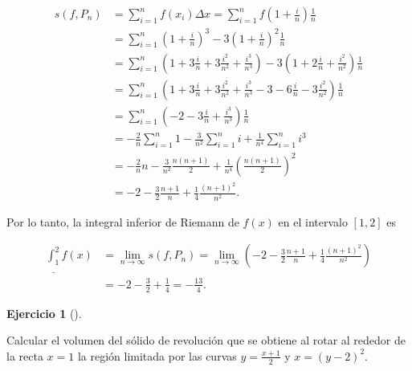 \documentclass[
  a4paper,
]{scrreport}
\theoremstyle{definition}
\newtheorem{exercise}{Ejercicio}[chapter]
\theoremstyle{remark}
\begin{document}
\begin{tcolorbox}
\begin{align*}
s(f,P_n) 
&= \sum_{i=1}^{n} f(x_i) \Delta x = \sum_{i=1}^{n} f\left(1 + \frac{i}{n}\right) \frac{1}{n} \\
&= \sum_{i=1}^{n} \left(1 + \frac{i}{n}\right)^3 - 3\left(1 + \frac{i}{n}\right)^2 \frac{1}{n} \\
&= \sum_{i=1}^{n} \left(1 + 3\frac{i}{n} + 3\frac{i^2}{n^2} + \frac{i^3}{n^3}\right) - 3\left(1 + 2\frac{i}{n} + \frac{i^2}{n^2}\right) \frac{1}{n} \\
&= \sum_{i=1}^{n} \left(1 + 3\frac{i}{n} + 3\frac{i^2}{n^2} + \frac{i^3}{n^3} - 3 - 6\frac{i}{n} - 3\frac{i^2}{n^2}\right) \frac{1}{n}\\
&= \sum_{i=1}^{n} \left(-2 - 3\frac{i}{n} + \frac{i^3}{n^3}\right) \frac{1}{n}\\
&= -\frac{2}{n} \sum_{i=1}^{n} 1 - \frac{3}{n^2} \sum_{i=1}^{n} i + \frac{1}{n^4}\sum_{i=1}^{n} i^3 \\
&= -\frac{2}{n} n - \frac{3}{n^2} \frac{n(n+1)}{2} + \frac{1}{n^4} \left(\frac{n(n+1)}{2}\right)^2 \\
&= -2 - \frac{3}{2} \frac{n+1}{n} + \frac{1}{4} \frac{(n+1)^2}{n^2}.
\end{align*}

Por lo tanto, la integral inferior de Riemann de \(f(x)\) en el
intervalo \([1, 2]\) es

\begin{align*}
\underline{\int_1^2} f(x) 
&= \lim_{n \to \infty} s(f,P_n) 
= \lim_{n \to \infty} \left(-2 - \frac{3}{2} \frac{n+1}{n} + \frac{1}{4} \frac{(n+1)^2}{n^2}\right) \\
&= -2 - \frac{3}{2} + \frac{1}{4} = -\frac{13}{4}.
\end{align*}

\end{tcolorbox}

\begin{exercise}[]\protect\hypertarget{exr-2}{}\label{exr-2}

Calcular el volumen del sólido de revolución que se obtiene al rotar al
rededor de la recta \(x=1\) la región limitada por las curvas
\(y=\frac{x+1}{2}\) y \(x=(y-2)^2\).

\end{exercise}
\end{document}
